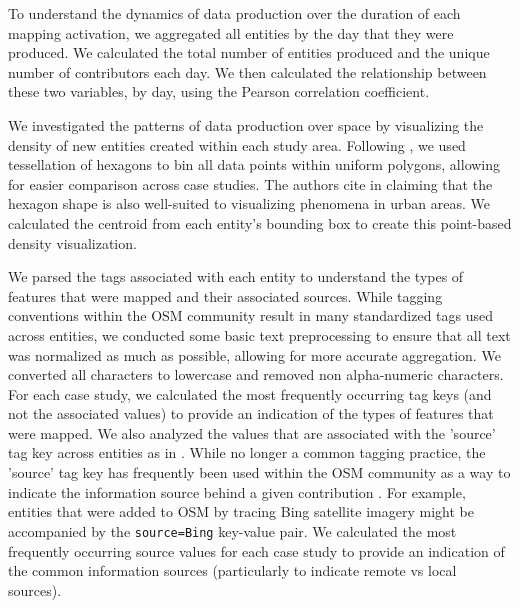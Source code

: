 To understand the dynamics of data production over the duration of each mapping activation, we aggregated all entities by the day that they were produced. We calculated the total number of entities produced and the unique number of contributors each day. We then calculated the relationship between these two variables, by day, using the Pearson correlation coefficient. 

We investigated the patterns of data production over space by visualizing the density of new entities created within each study area. Following \textcite{grochenig_estimating_2014}, we used tessellation of hexagons to bin all data points within uniform polygons, allowing for easier comparison across case studies. The authors cite \textcite{hagenauer_mining_2012} in claiming that the hexagon shape is also well-suited to visualizing phenomena in urban areas. We calculated the centroid from each entity's bounding box to create this point-based density visualization. 

We parsed the tags associated with each entity to understand the types of features that were mapped and their associated sources. While tagging conventions within the OSM community result in many standardized tags used across entities, we conducted some basic text preprocessing to ensure that all text was normalized as much as possible, allowing for more accurate aggregation. We converted all characters to lowercase and removed non alpha-numeric characters. For each case study, we calculated the most frequently occurring tag keys (and not the associated values) to provide an indication of the types of features that were mapped. We also analyzed the values that are associated with the 'source' tag key across entities as in \textcite{ahmouda_analyzing_2018}. While no longer a common tagging practice, the 'source' tag key has frequently been used within the OSM community as a way to indicate the information source behind a given contribution \parencite{noauthor_keysource_nodate}. For example, entities that were added to OSM by tracing Bing satellite imagery might be accompanied by the \texttt{source=Bing} key-value pair. We calculated the most frequently occurring source values for each case study to provide an indication of the common information sources (particularly to indicate remote vs local sources). 

